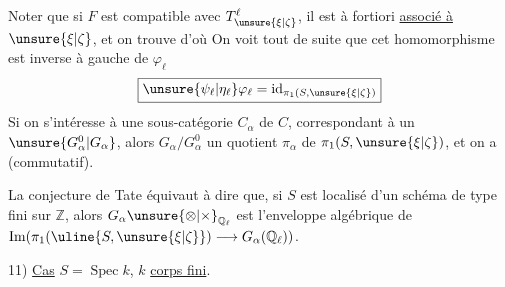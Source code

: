Noter que si $F$ est compatible avec $T^\ell_{\unsure{\xi|\zeta}}$, il est
à fortiori \uline{associé à} $\unsure{\xi|\zeta}$, et on trouve
d'où
On voit tout de suite que cet homomorphisme
est inverse à gauche de $\varphi_\ell$
\[
 \boxed{\unsure{\psi_\ell|\eta_\ell}\varphi_\ell
   =\operatorname{id}_{\pi_1(S,\unsure{\xi|\zeta})}}
\]
Si on s'intéresse à une sous-catégorie $C_\alpha$ de $C$,
correspondant à un $\unsure{G_\alpha^0|G_\alpha}$, alors $G_\alpha/G_\alpha^0$
 un quotient $\pi_\alpha$ de $\pi_1(S,\unsure{\xi|\zeta})$,
et on a
(commutatif).

La conjecture de Tate 
équivaut à dire que, si
$S$ est localisé d'un schéma de type fini sur $\mathbb{Z}$, alors
$G_\alpha\unsure{\otimes|\times}_{\mathbb{Q}_\ell}$ est
l'enveloppe algébrique de $\operatorname{Im}(\pi_1(\uline{S,\unsure{\xi|\zeta}})
\longrightarrow G_\alpha(\mathbb{Q}_\ell))$.



11) \uline{Cas} $S=\operatorname{Spec}k$, $k$ \uline{corps fini}.

